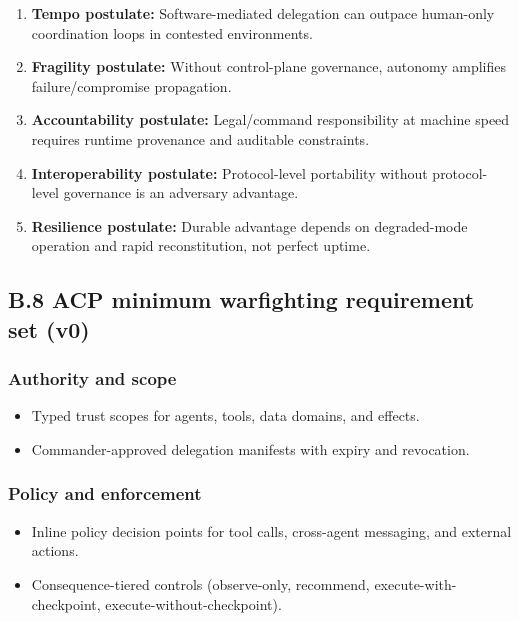 \documentclass[
]{article}
\providecommand{\tightlist}{%
  \setlength{\itemsep}{0pt}\setlength{\parskip}{0pt}}
\begin{document}
\begin{enumerate}
\def\labelenumi{\arabic{enumi}.}
\tightlist
\item
  \textbf{Tempo postulate:} Software-mediated delegation can outpace
  human-only coordination loops in contested environments.
\item
  \textbf{Fragility postulate:} Without control-plane governance,
  autonomy amplifies failure/compromise propagation.
\item
  \textbf{Accountability postulate:} Legal/command responsibility at
  machine speed requires runtime provenance and auditable constraints.
\item
  \textbf{Interoperability postulate:} Protocol-level portability
  without protocol-level governance is an adversary advantage.
\item
  \textbf{Resilience postulate:} Durable advantage depends on
  degraded-mode operation and rapid reconstitution, not perfect uptime.
\end{enumerate}

\hypertarget{b.8-acp-minimum-warfighting-requirement-set-v0}{%
\subsection{B.8 ACP minimum warfighting requirement set
(v0)}\label{b.8-acp-minimum-warfighting-requirement-set-v0}}

\hypertarget{authority-and-scope}{%
\subsubsection{Authority and scope}\label{authority-and-scope}}

\begin{itemize}
\tightlist
\item
  Typed trust scopes for agents, tools, data domains, and effects.
\item
  Commander-approved delegation manifests with expiry and revocation.
\end{itemize}

\hypertarget{policy-and-enforcement}{%
\subsubsection{Policy and enforcement}\label{policy-and-enforcement}}

\begin{itemize}
\tightlist
\item
  Inline policy decision points for tool calls, cross-agent messaging,
  and external actions.
\item
  Consequence-tiered controls (observe-only, recommend,
  execute-with-checkpoint, execute-without-checkpoint).
\end{itemize}
\end{document}
